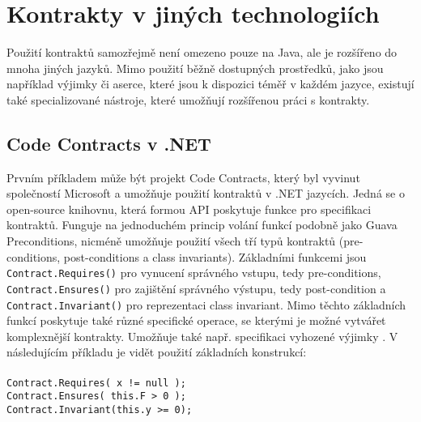 	\section{Kontrakty v jiných technologiích}
		Použití kontraktů samozřejmě není omezeno pouze na Java, ale je rozšířeno do mnoha jiných jazyků. Mimo použití běžně dostupných prostředků, jako jsou například výjimky či aserce, které jsou k dispozici téměř v každém jazyce, existují také specializované nástroje, které umožňují rozšířenou práci s kontrakty.
		
		\subsection{Code Contracts v .NET}
			Prvním příkladem může být projekt Code Contracts, který byl vyvinut společností Microsoft a umožňuje použití kontraktů v .NET jazycích. Jedná se o open-source knihovnu, která formou API poskytuje funkce pro specifikaci kontraktů. Funguje na jednoduchém princip volání funkcí podobně jako Guava Preconditions, nicméně umožňuje použití všech tří typů kontraktů (pre-conditions, post-conditions a class invariants). Základními funkcemi jsou \texttt{Contract.Requires()} pro vynucení správného vstupu, tedy pre-conditions, \texttt{Contract.Ensures()} pro zajištění správného výstupu, tedy post-condition a \texttt{Contract.Invariant()} pro reprezentaci class invariant. Mimo těchto základních funkcí poskytuje také různé specifické operace, se kterými je možné vytvářet komplexnější kontrakty. Umožňuje také např. specifikaci vyhozené výjimky \cite{codeContracts}\cite{codeContracts2}. V následujícím příkladu je vidět použití základních konstrukcí:\\\\
			\- \- \- \- \- \texttt{Contract.Requires( x != null );}\\
			\- \- \- \- \- \texttt{Contract.Ensures( this.F > 0 );}\\
			\- \- \- \- \- \texttt{Contract.Invariant(this.y >= 0);}\\  
			